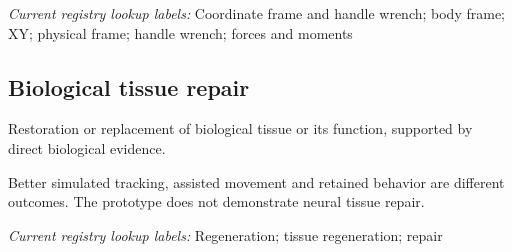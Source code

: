 \noindent\textit{Current registry lookup labels:} Coordinate frame and handle wrench; body frame; XY; physical frame; handle wrench; forces and moments\par

\begin{samepage}
\subsection*{Biological tissue repair}
\noindent Restoration or replacement of biological tissue or its function, supported by direct biological evidence.\par
\end{samepage}
\begin{samepage}
\noindent Better simulated tracking, assisted movement and retained behavior are different outcomes. The prototype does not demonstrate neural tissue repair.\par\nopagebreak[4]

\end{samepage}


\noindent\textit{Current registry lookup labels:} Regeneration; tissue regeneration; repair\par

